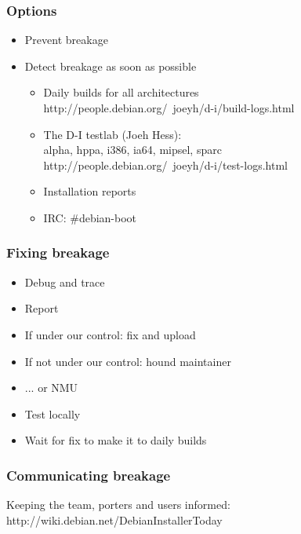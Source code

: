 \documentclass{beamer}
\begin{document}
\begin{frame}
  \frametitle{Options}
	\begin{itemize}[<+->]
	\item
		Prevent breakage
	\item
		Detect breakage as soon as possible
		\begin{itemize}
		\item
			Daily builds for all architectures \\
			http://people.debian.org/~joeyh/d-i/build-logs.html
		\item
			The D-I testlab (Joeh Hess): \\
			alpha, hppa, i386, ia64, mipsel, sparc \\
			http://people.debian.org/~joeyh/d-i/test-logs.html
		\item
			Installation reports
		\item
			IRC: \#debian-boot
		\end{itemize}
	\end{itemize}
\end{frame}

\begin{frame}
  \frametitle{Fixing breakage}
	\begin{itemize}[<+->]
	\item
		Debug and trace
	\item
		Report
	\item
		If under our control: fix and upload
	\item
		If not under our control: hound maintainer
	\item
		... or NMU
	\item
		Test locally
	\item
		Wait for fix to make it to daily builds
	\end{itemize}
\end{frame}

\begin{frame}
  \frametitle{Communicating breakage}
Keeping the team, porters and users informed: \\
http://wiki.debian.net/DebianInstallerToday
\end{frame}
\end{document}
